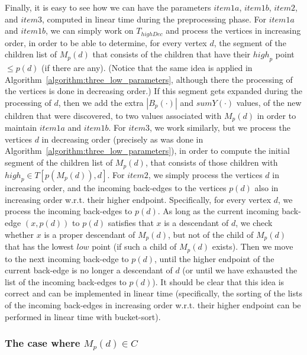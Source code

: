 \documentclass[11pt,a4paper]{article}
\begin{document}
Finally, it is easy to see how we can have the parameters $\mathit{item1a}$, $\mathit{item1b}$, $\mathit{item2}$, and $\mathit{item3}$, computed in linear time during the preprocessing phase. For $\mathit{item1a}$ and $\mathit{item1b}$, we can simply work on $T_\mathit{highDec}$ and process the vertices in increasing order, in order to be able to determine, for every vertex $d$, the segment of the children list of $M_p(d)$ that consists of the children that have their $\mathit{high}_p$ point $\leq p(d)$ (if there are any). (Notice that the same idea is applied in Algorithm~\ref{algorithm:three_low_parameters}, although there the processing of the vertices is done in decreasing order.) If this segment gets expanded during the processing of $d$, then we add the extra $|B_p(\cdot)|$ and $\mathit{sumY}(\cdot)$ values, of the new children that were discovered, to two values associated with $M_p(d)$ in order to maintain $\mathit{item1a}$ and $\mathit{item1b}$. For $\mathit{item3}$, we work similarly, but we process the vertices $d$ in decreasing order (precisely as was done in Algorithm~\ref{algorithm:three_low_parameters}), in order to compute the initial segment of the children list of $M_p(d)$, that consists of those children with $\mathit{high}_p\in T[p(M_p(d)),d]$. For $\mathit{item2}$, we simply process the vertices $d$ in increasing order, and the incoming back-edges to the vertices $p(d)$ also in increasing order w.r.t. their higher endpoint. Specifically, for every vertex $d$, we process the incoming back-edges to $p(d)$. As long as the current incoming back-edge $(x,p(d))$ to $p(d)$ satisfies that $x$ is a descendant of $d$, we check whether $x$ is a proper descendant of $M_p(d)$, but not of the child of $M_p(d)$ that has the lowest $\mathit{low}$ point (if such a child of $M_p(d)$ exists). Then we move to the next incoming back-edge to $p(d)$, until the higher endpoint of the current back-edge is no longer a descendant of $d$ (or until we have exhausted the list of the incoming back-edges to $p(d)$). It should be clear that this idea is correct and can be implemented in linear time (specifically, the sorting of the lists of the incoming back-edges in increasing order w.r.t. their higher endpoint can be performed in linear time with bucket-sort).


\subsubsection{The case where $M_p(d)\in C$}
\label{section:M(c)inDM(d)inC}
\end{document}
